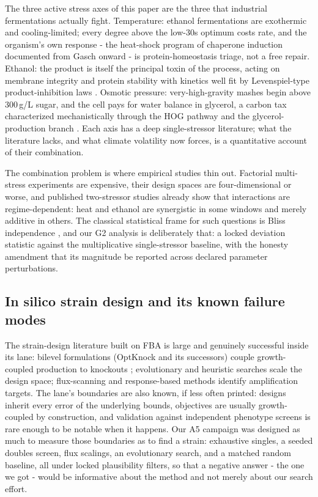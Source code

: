 \documentclass[12pt]{article}
\begin{document}
The three active stress axes of this paper are the three that
industrial fermentations actually fight. Temperature: ethanol
fermentations are exothermic and cooling-limited; every degree above
the low-30s optimum costs rate, and the organism's own response -
the heat-shock program of chaperone induction documented from Gasch
onward \cite{gasch,verghese} - is protein-homeostasis triage, not a
free repair. Ethanol: the product is itself the principal toxin of
the process, acting on membrane integrity and protein stability with
kinetics well fit by Levenspiel-type product-inhibition laws
\cite{levenspiel,etohinhib}. Osmotic pressure: very-high-gravity
mashes begin above 300\,g/L sugar, and the cell pays for water
balance in glycerol, a carbon tax characterized mechanistically
through the HOG pathway and the glycerol-production branch
\cite{hohmann}. Each axis has a deep single-stressor literature;
what the literature lacks, and what climate volatility now forces, is
a quantitative account of their combination.

The combination problem is where empirical studies thin out. Factorial
multi-stress experiments are expensive, their design spaces are
four-dimensional or worse, and published two-stressor studies already
show that interactions are regime-dependent: heat and ethanol are
synergistic in some windows and merely additive in others. The
classical statistical frame for such questions is Bliss independence
\cite{bliss}, and our G2 analysis is deliberately that: a locked
deviation statistic against the multiplicative single-stressor
baseline, with the honesty amendment that its magnitude be reported
across declared parameter perturbations.

\subsection{In silico strain design and its known failure modes}

The strain-design literature built on FBA is large and genuinely
successful inside its lane: bilevel formulations (OptKnock and its
successors) couple growth-coupled production to knockouts
\cite{optknock}; evolutionary and heuristic searches scale the design
space; flux-scanning and response-based methods identify amplification
targets. The lane's boundaries are also known, if less often printed:
designs inherit every error of the underlying bounds, objectives are
usually growth-coupled by construction, and validation against
independent phenotype screens is rare enough to be notable when it
happens. Our A5 campaign was designed as much to measure those
boundaries as to find a strain: exhaustive singles, a seeded doubles
screen, flux scalings, an evolutionary search, and a matched random
baseline, all under locked plausibility filters, so that a negative
answer - the one we got - would be informative about the method and
not merely about our search effort.
\end{document}
